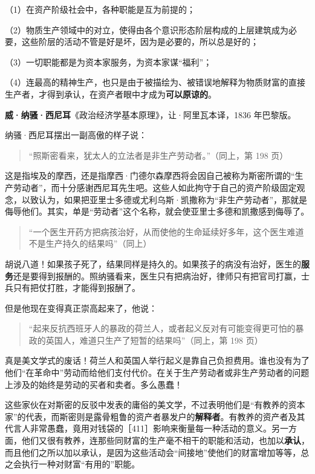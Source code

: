 （1）在资产阶级社会中，各种职能是互为前提的；

（2）物质生产领域中的对立，使得由各个意识形态阶层构成的上层建筑成为必要，这些阶层的活动不管是好是坏，因为是必要的，所以总是好的；

（3）一切职能都是为资本家服务，为资本家谋“福利”；

（4）连最高的精神生产，也只是由于被描绘为、被错误地解释为物质财富的直接生产者，才得到承认，在资产者眼中才成为\textbf{可以原谅的}。


\textbf{威·纳骚·西尼耳}《政治经济学基本原理》，让·阿里瓦本译，1836 年巴黎版。

纳骚·西尼耳摆出一副高傲的样子说：

\begin{quote}“照斯密看来，犹太人的立法者是非生产劳动者。”（同上，第 198 页）\end{quote}

这是指埃及的摩西，还是指摩西·门德尔森摩西将会因自己被称为斯密所谓的“生产劳动者”，而十分感谢西尼耳先生吧。这些人如此拘守于自己的资产阶级固定观念，以致认为，如果把亚里士多德或尤利乌斯·凯撒称为“非生产劳动者”，那就是侮辱他们。其实，单是“劳动者”这个名称，就会使亚里士多德和凯撒感到侮辱了。

\begin{quote}“一个医生开药方把病孩治好，从而使他的生命延续好多年，这个医生难道不是生产持久的结果吗”（同上）\end{quote}

胡说八道！如果孩子死了，结果同样是持久的。如果孩子的病没有治好，医生的\textbf{服务}还是要得到报酬的。照纳骚看来，医生只有把病治好，律师只有把官司打赢，士兵只有把仗打胜，才能得到报酬了。

但是他现在变得真正崇高起来了，他说：

\begin{quote}“起来反抗西班牙人的暴政的荷兰人，或者起义反对有可能变得更可怕的暴政的英国人，难道只生产了短暂的结果吗”（同上，第 198 页）\end{quote}

真是美文学式的废话！荷兰人和英国人举行起义是靠自己负担费用。谁也没有为了他们“在革命中”劳动而给他们支付代价。在关于生产劳动者或非生产劳动者的问题上涉及的始终是劳动的买者和卖者。多么愚蠢！

这些家伙在对斯密的反驳中发表的庸俗的美文学，不过表明他们是“有教养的资本家”的代表，而斯密则是露骨粗鲁的资产者暴发户的\textbf{解释者}。有教养的资产者及其代言人非常愚蠢，竟用对钱袋的［411］影响来衡量每一种活动的意义。另一方面，他们又很有教养，连那些同财富的生产毫不相干的职能和活动，也加以\textbf{承认}，而且他们之所以加以承认，是因为这些活动会“间接地”使他们的财富增加等等，总之会执行一种对财富“有用的”职能。

